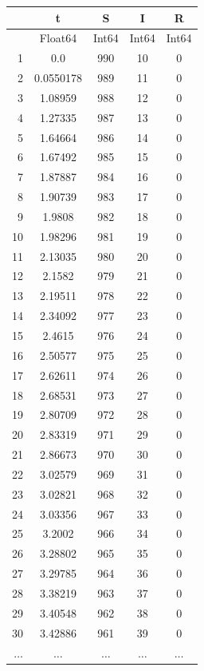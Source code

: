 \documentclass[
  12pt,
  a4paper,
  DIV=11,
  numbers=noendperiod]{scrreprt}
\begin{document}
\begin{tabular}{r|cccc}
    & t & S & I & R\\
    \hline
    & Float64 & Int64 & Int64 & Int64\\
    \hline
    1 & 0.0 & 990 & 10 & 0 \\
    2 & 0.0550178 & 989 & 11 & 0 \\
    3 & 1.08959 & 988 & 12 & 0 \\
    4 & 1.27335 & 987 & 13 & 0 \\
    5 & 1.64664 & 986 & 14 & 0 \\
    6 & 1.67492 & 985 & 15 & 0 \\
    7 & 1.87887 & 984 & 16 & 0 \\
    8 & 1.90739 & 983 & 17 & 0 \\
    9 & 1.9808 & 982 & 18 & 0 \\
    10 & 1.98296 & 981 & 19 & 0 \\
    11 & 2.13035 & 980 & 20 & 0 \\
    12 & 2.1582 & 979 & 21 & 0 \\
    13 & 2.19511 & 978 & 22 & 0 \\
    14 & 2.34092 & 977 & 23 & 0 \\
    15 & 2.4615 & 976 & 24 & 0 \\
    16 & 2.50577 & 975 & 25 & 0 \\
    17 & 2.62611 & 974 & 26 & 0 \\
    18 & 2.68531 & 973 & 27 & 0 \\
    19 & 2.80709 & 972 & 28 & 0 \\
    20 & 2.83319 & 971 & 29 & 0 \\
    21 & 2.86673 & 970 & 30 & 0 \\
    22 & 3.02579 & 969 & 31 & 0 \\
    23 & 3.02821 & 968 & 32 & 0 \\
    24 & 3.03356 & 967 & 33 & 0 \\
    25 & 3.2002 & 966 & 34 & 0 \\
    26 & 3.28802 & 965 & 35 & 0 \\
    27 & 3.29785 & 964 & 36 & 0 \\
    28 & 3.38219 & 963 & 37 & 0 \\
    29 & 3.40548 & 962 & 38 & 0 \\
    30 & 3.42886 & 961 & 39 & 0 \\
    $\dots$ & $\dots$ & $\dots$ & $\dots$ & $\dots$ \\
\end{tabular}
\end{document}
